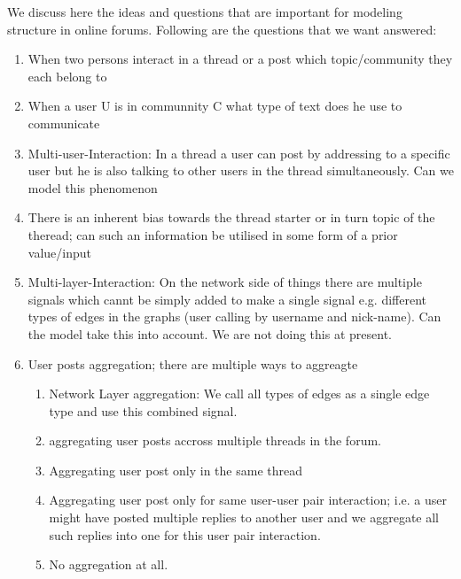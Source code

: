 We discuss here the ideas and questions that are important for modeling
structure in online forums. Following are the questions that we want answered:
\begin{enumerate}
  \item When two persons interact in a thread or a post which topic/community they
each belong to
	\item When a user U is in communnity C what type of text does he use to
	communicate
	\item Multi-user-Interaction: In a thread a user can post by addressing to a
	specific user but he is also talking to other users in the thread simultaneously. Can we model this
	phenomenon
	\item There is an inherent bias towards the thread starter or in turn topic of
	the theread; can such an information be utilised in some form of a prior
	value/input
	\item Multi-layer-Interaction: On the network side of things there are multiple
	signals which cannt be simply added to make a single signal e.g. different
	types of edges in the graphs (user calling by username and nick-name). Can the
	model take this into account. We are not doing this at present.
	\item User posts aggregation; there are multiple ways to aggreagte
	\begin{enumerate}
		\item Network Layer aggregation: We call all types of edges as a single
		edge type and use this combined signal. 
		\item aggregating user posts accross multiple threads in the forum.
		\item Aggregating user post only in the same thread
		\item Aggregating user post only for same user-user pair interaction; i.e. a user might have
		posted multiple replies to another user and we aggregate all such replies into
		one for this user pair interaction.
		\item No aggregation at all.
	\end{enumerate}
\end{enumerate}
